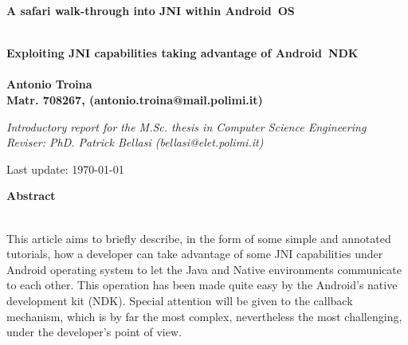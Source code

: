 \documentclass[a4paper,10pt]{article}
\newenvironment*{mytitle}{\begin{LARGE}\bf}{\end{LARGE}\\}%
\newenvironment*{mysubtitle}{\bf}{\\[1.5ex]}%
\newenvironment*{myabstract}{\begin{Large}\bf}{\end{Large}\\[2.5ex]}%
\begin{document}
\begin{mytitle}A safari walk-through into JNI within Android\texttrademark \ OS\end{mytitle}
\begin{mysubtitle}
Exploiting JNI capabilities taking advantage of Android\texttrademark \ NDK
\end{mysubtitle}
%
%
\\
Antonio Troina\\
Matr. 708267, (antonio.troina@mail.polimi.it)\\
\hspace{10ex}
\begin{flushright}
\emph{Introductory report for the M.Sc. thesis in Computer Science Engineering}\\
\emph{Reviser: PhD. Patrick Bellasi (bellasi@elet.polimi.it)}
\end{flushright}

Last update: \today
\\
\hspace{10ex}

\begin{myabstract} Abstract \end{myabstract}
This article aims to briefly describe, in the form of some simple and annotated tutorials, how a developer can take advantage of some JNI capabilities under Android operating system to let the Java and Native environments communicate to each other. This operation has been made quite easy by the Android's native development kit (NDK). Special attention will be given to the callback mechanism, which is by far the most complex, nevertheless the most challenging, under the developer's point of view.
\end{document}
